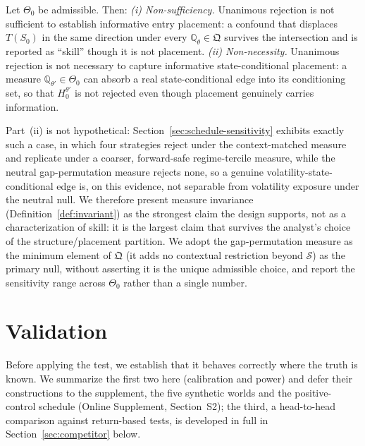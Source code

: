 \documentclass[risks,article,submit,pdftex,oneauthor]{Definitions/mdpi}
\begin{document}
\begin{Proposition}
\label{prop:nonsuff}
Let $\Theta_0$ be admissible. Then:
\emph{(i) Non-sufficiency.} Unanimous rejection is not sufficient to establish
informative entry placement: a confound that displaces $T(S_0)$ in the same
direction under every $\mathbb{Q}_\theta\in\mathfrak Q$ survives the intersection
and is reported as ``skill'' though it is not placement.
\emph{(ii) Non-necessity.} Unanimous rejection is not necessary to capture
informative state-conditional placement: a measure $\mathbb{Q}_{\theta'}\in\Theta_0$
can absorb a real state-conditional edge into its conditioning set, so that
$H_0^{\theta'}$ is not rejected even though placement genuinely carries information.
\end{Proposition}

Part~(ii) is not hypothetical: Section~\ref{sec:schedule-sensitivity} exhibits
exactly such a case, in which four strategies reject under the context-matched
measure and replicate under a coarser, forward-safe regime-tercile measure, while the
neutral gap-permutation measure rejects none, so a genuine volatility-state-conditional
edge is, on this evidence, not separable from volatility exposure under the neutral null. We therefore present measure invariance
(Definition~\ref{def:invariant}) as the strongest claim the design supports, not
as a characterization of skill: it is the largest claim that survives the
analyst's choice of the structure/placement partition. We adopt the
gap-permutation measure as the minimum element of $\mathfrak Q$ (it adds no
contextual restriction beyond $\mathcal S$) as the primary null, without
asserting it is the unique admissible choice, and report the sensitivity range
across $\Theta_0$ rather than a single number.

\section{Validation}
\label{sec:simulation-validation}

Before applying the test, we establish that it behaves correctly where the truth is known. We summarize the first two here (calibration and power) and defer their constructions to the supplement, the five synthetic worlds and the positive-control schedule (Online Supplement, Section~S2); the third, a head-to-head comparison against return-based tests, is developed in full in Section~\ref{sec:competitor} below.
\end{document}
